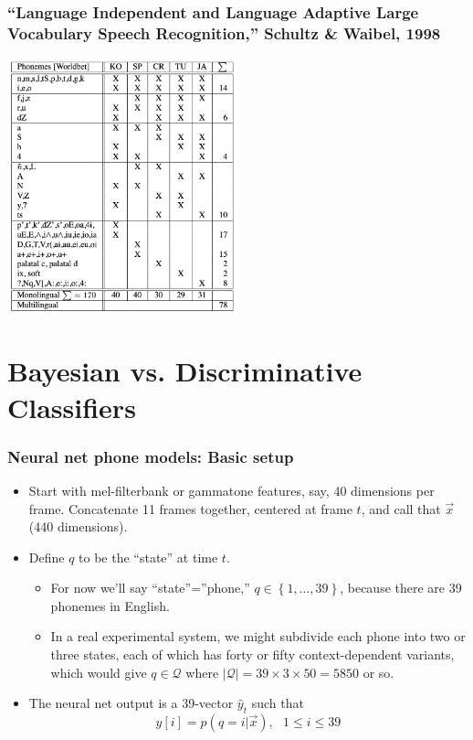 \documentclass{beamer}
\begin{document}
\begin{frame}
  \frametitle{``Language Independent and Language Adaptive Large
    Vocabulary Speech Recognition,'' Schultz \& Waibel, 1998}
  \centerline{\includegraphics[height=2.9in]{schultz1998.png}}
\end{frame}

\section[Bayesian vs. Discriminative]{Bayesian vs. Discriminative Classifiers}
\setcounter{subsection}{1}

\begin{frame}
  \frametitle{Neural net phone models: Basic setup}

  \begin{itemize}
    \item Start with mel-filterbank or gammatone features, say, 40
      dimensions per frame.  Concatenate 11 frames together, centered
      at frame $t$, and call that $\vec{x}$ (440 dimensions).
    \item Define $q$ to be the ``state'' at time $t$.
      \begin{itemize}
      \item For now we'll say ``state''=''phone,''
        $q\in\left\{1,\ldots,39\right\}$, because there are 39
        phonemes in English.
      \item In a real experimental system, we might subdivide each
        phone into two or three states, each of which has forty or
        fifty context-dependent variants, which would give
        $q\in{\mathcal Q}$ where $|{\mathcal Q}|=39\times 3\times
        50=5850$ or so.
      \end{itemize}
    \item The neural net output is a 39-vector $\hat{y}_t$ such that
      \[
      \hat{y}[i] = p\left(q=i|\vec{x}\right),~~~1\le i\le 39
      \]
  \end{itemize}
\end{frame}
\end{document}

